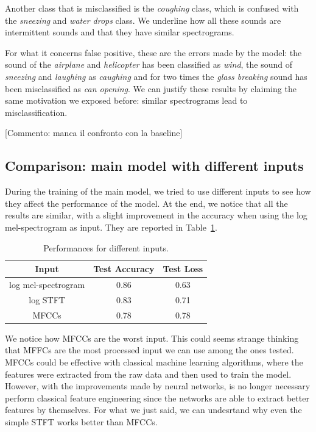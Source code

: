 \documentclass{article}
\begin{document}
\begin{sloppy}
Another class that is misclassified is the \textit{coughing} class, which is confused with the 
\textit{sneezing} and \textit{water drops} class. We underline how all these sounds are intermittent sounds
and that they have similar spectrograms.

For what it concerns false positive, these are the errors made by the model: the sound of the \textit{airplane} and
\textit{helicopter} has been classified as \textit{wind}, the sound of \textit{sneezing} and \textit{laughing} as \textit{caughing}
and for two times the \textit{glass breaking} sound has been misclassified as \textit{can opening}. We can justify
these results by claiming the same motivation we exposed before: similar spectrograms lead to misclassification.

[Commento: manca il confronto con la baseline]

\subsection{Comparison: main model with different inputs}
\label{sec:comparison_1}
During the training of the main model, we tried to use different inputs to see how they affect the performance of the model.
At the end, we notice that all the results are similar, with a slight improvement in the accuracy when using the log mel-spectrogram as input.
They are reported in Table~\ref{tab:comparison_inputs}.
\begin{table}[ht]
  \centering
  \caption{Performances for different inputs.}
  \label{tab:comparison_inputs}
  \begin{tabular}{|c|c|c|}
    \hline
    Input & Test Accuracy & Test Loss \\
    \hline
    log mel-spectrogram & 0.86 & 0.63 \\
    log STFT & 0.83 & 0.71 \\
    MFCCs & 0.78 & 0.78 \\
    \hline
  \end{tabular}
\end{table}

We notice how MFCCs are the worst input. This could seems strange thinking that MFFCs are the most processed input we can use among the ones tested.
MFCCs could be effective with classical machine learning algorithms, where the features were extracted from the raw data and then used to train the model.
However, with the improvements made by neural networks, is no longer necessary perform classical feature engineering since the networks
are able to extract better features by themselves. For what we just said, we can undesrtand why even the simple
STFT works better than MFCCs.



\end{sloppy}
\end{document}
